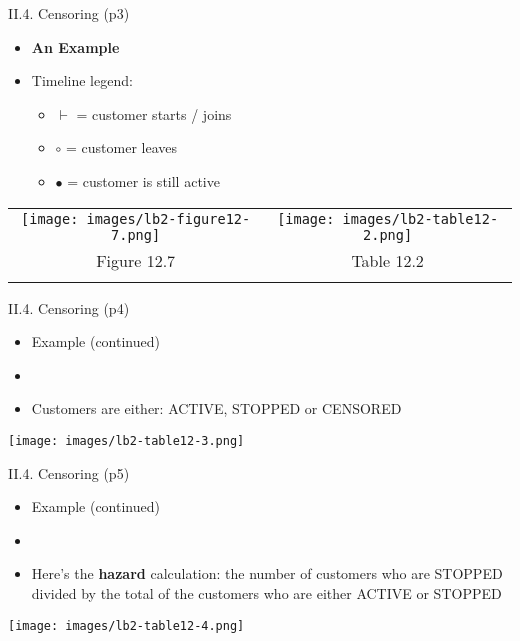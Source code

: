\documentclass[handout]{beamer}
\newcommand{\strong}[1]{\textbf{\color{teal} #1}}
\newcommand{\stronger}[1]{\textbf{\color{purple} #1}}
\begin{document}
\begin{frame}{II.4. Censoring (p3)}
\begin{itemize}
\item[] \strong{An Example}
\item Timeline legend:
	\begin{itemize}
	\item $\vdash$ = customer starts / joins
	\item $\circ$ = customer leaves
	\item $\bullet$ = customer is still active
	\end{itemize} 
\end{itemize}
\begin{center}
\begin{tabular}{cc}
\texttt{[image: images/lb2-figure12-7.png]} &
\texttt{[image: images/lb2-table12-2.png]} \\
Figure 12.7 & Table 12.2 \\
\multicolumn{2}{c}{\cite{LB2:2004}}\\
\end{tabular}
\end{center}
\end{frame}
\begin{frame}{II.4. Censoring (p4)}
\begin{itemize}
\item[] Example (continued)
\item[]
\item Customers are either: ACTIVE, STOPPED or CENSORED
\end{itemize}
\begin{center}
\texttt{[image: images/lb2-table12-3.png]} \\
\cite[Table 12.3]{LB2:2004}
\end{center}
\end{frame}
\begin{frame}{II.4. Censoring (p5)}
\begin{itemize}
\item[] Example (continued)
\item[]
\item Here's the \stronger{hazard} calculation:
the number of customers who are STOPPED divided by the total of the customers who are either ACTIVE or STOPPED
\end{itemize}
\begin{center}
\texttt{[image: images/lb2-table12-4.png]} \\
\cite[Table 12.4]{LB2:2004}
\end{center}
\end{frame}
\end{document}
